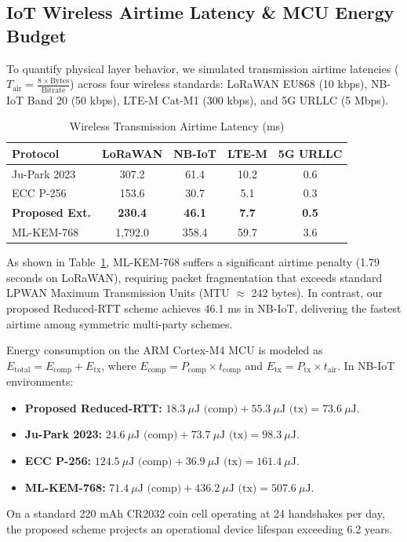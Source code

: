 \documentclass[journal,10pt,twocolumn]{IEEEtran}
\begin{document}
\subsection{IoT Wireless Airtime Latency \& MCU Energy Budget}
To quantify physical layer behavior, we simulated transmission airtime latencies ($T_{\text{air}} = \frac{8 \times \text{Bytes}}{\text{Bitrate}}$) across four wireless standards: LoRaWAN EU868 (10 kbps), NB-IoT Band 20 (50 kbps), LTE-M Cat-M1 (300 kbps), and 5G URLLC (5 Mbps).

\begin{table}[htbp]
\caption{Wireless Transmission Airtime Latency (ms)}
\begin{center}
\begin{tabular}{lcccc}
\toprule
\textbf{Protocol} & \textbf{LoRaWAN} & \textbf{NB-IoT} & \textbf{LTE-M} & \textbf{5G URLLC} \\
\midrule
Ju-Park 2023 & 307.2 & 61.4 & 10.2 & 0.6 \\
ECC P-256 & 153.6 & 30.7 & 5.1 & 0.3 \\
\textbf{Proposed Ext.} & \textbf{230.4} & \textbf{46.1} & \textbf{7.7} & \textbf{0.5} \\
ML-KEM-768 & 1,792.0 & 358.4 & 59.7 & 3.6 \\
\bottomrule
\end{tabular}
\label{tab:wireless}
\end{center}
\end{table}

As shown in Table~\ref{tab:wireless}, ML-KEM-768 suffers a significant airtime penalty (1.79 seconds on LoRaWAN), requiring packet fragmentation that exceeds standard LPWAN Maximum Transmission Units (MTU $\approx$ 242 bytes). In contrast, our proposed Reduced-RTT scheme achieves 46.1 ms in NB-IoT, delivering the fastest airtime among symmetric multi-party schemes.

Energy consumption on the ARM Cortex-M4 MCU is modeled as $E_{\text{total}} = E_{\text{comp}} + E_{\text{tx}}$, where $E_{\text{comp}} = P_{\text{comp}} \times t_{\text{comp}}$ and $E_{\text{tx}} = P_{\text{tx}} \times t_{\text{air}}$. In NB-IoT environments:
\begin{itemize}
    \item \textbf{Proposed Reduced-RTT:} $18.3\ \mu\text{J (comp)} + 55.3\ \mu\text{J (tx)} = 73.6\ \mu\text{J}$.
    \item \textbf{Ju-Park 2023:} $24.6\ \mu\text{J (comp)} + 73.7\ \mu\text{J (tx)} = 98.3\ \mu\text{J}$.
    \item \textbf{ECC P-256:} $124.5\ \mu\text{J (comp)} + 36.9\ \mu\text{J (tx)} = 161.4\ \mu\text{J}$.
    \item \textbf{ML-KEM-768:} $71.4\ \mu\text{J (comp)} + 436.2\ \mu\text{J (tx)} = 507.6\ \mu\text{J}$.
\end{itemize}
On a standard 220 mAh CR2032 coin cell operating at 24 handshakes per day, the proposed scheme projects an operational device lifespan exceeding 6.2 years.
\end{document}
